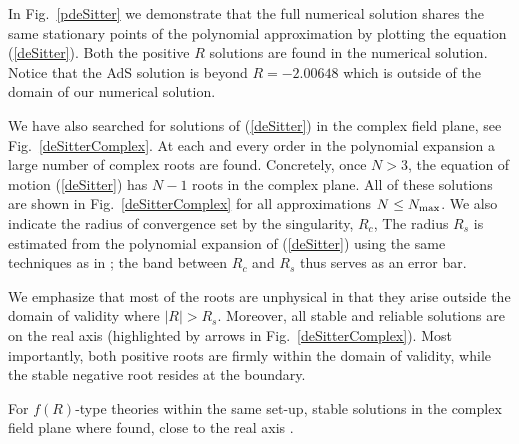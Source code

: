 \documentclass[notitlepage,eqsecnum,bm,amsmath,preprintnumbers,superscriptaddress,nofootinbib,aps,11pt]{revtex4-1}
\def\eq#1{(\ref{#1})}
\def\R{\rho}
\def\R{R}
\begin{document}
 
 In Fig.~\ref{pdeSitter} 
we demonstrate  that the full numerical solution shares the same stationary points of the polynomial approximation by plotting the equation \eq{deSitter}. Both the positive $R$ solutions are found in the numerical solution. Notice that the AdS solution is beyond  $\R = - 2.00648$ which is outside of the domain of our numerical solution.
 
 
We have also searched for solutions of \eq{deSitter} in the complex field plane, see Fig.~\ref{deSitterComplex}. At each and every order in the polynomial expansion a large number of complex roots are found. Concretely, once $N>3$,  the equation of motion \eq{deSitter} has $N-1$ roots in the complex plane. All of these solutions are shown in  Fig.~\ref{deSitterComplex} for all approximations $N\le N_{\rm max}$. 
We also indicate the radius of convergence set by the singularity, $R_c$,
The radius $R_s$ is estimated from the polynomial expansion of \eq{deSitter} using the same techniques as in \cite{Falls:2016wsa}; the band between $R_c$ and $R_s$ thus serves as an error bar.  


 We emphasize that most of the roots are unphysical in that they arise outside the domain of validity where $|R|>R_s$. Moreover, all stable and reliable solutions are on the real axis (highlighted by arrows in Fig.~\ref{deSitterComplex}).  Most importantly, both positive roots are firmly within the domain of validity, while the stable negative root resides at the boundary. 
 
For $f(R)$-type theories within the same set-up, stable solutions in the complex field plane where found, close to the real axis \cite{Falls:2016wsa}. 


 




 
\end{document}
